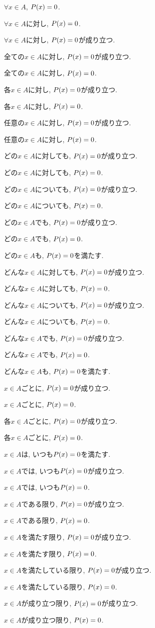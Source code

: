 \item $\forall x \in A$, $P(x)=0$.
\item $\forall x \in A$に対し, $P(x)=0$.
\item $\forall x \in A$に対し, $P(x)=0$が成り立つ.
\item 全ての$x\in A$に対し, $P(x)=0$が成り立つ.
\item 全ての$x\in A$に対し, $P(x)=0$.
\item 各$x\in A$に対し, $P(x)=0$が成り立つ.
\item 各$x\in A$に対し, $P(x)=0$.
\item 任意の$x\in A$に対し, $P(x)=0$が成り立つ.
\item 任意の$x\in A$に対し, $P(x)=0$.
\item どの$x\in A$に対しても, $P(x)=0$が成り立つ.
\item どの$x\in A$に対しても, $P(x)=0$.
\item どの$x\in A$についても, $P(x)=0$が成り立つ.
\item どの$x\in A$についても, $P(x)=0$.
\item どの$x\in A$でも, $P(x)=0$が成り立つ.
\item どの$x\in A$でも, $P(x)=0$.
\item どの$x\in A$も, $P(x)=0$を満たす.
\item どんな$x\in A$に対しても, $P(x)=0$が成り立つ.
\item どんな$x\in A$に対しても, $P(x)=0$.
\item どんな$x\in A$についても, $P(x)=0$が成り立つ.
\item どんな$x\in A$についても, $P(x)=0$.
\item どんな$x\in A$でも, $P(x)=0$が成り立つ.
\item どんな$x\in A$でも, $P(x)=0$.
\item どんな$x\in A$も, $P(x)=0$を満たす.
\item $x\in A$ごとに, $P(x)=0$が成り立つ.
\item $x\in A$ごとに, $P(x)=0$.
\item 各$x\in A$ごとに, $P(x)=0$が成り立つ.
\item 各$x\in A$ごとに, $P(x)=0$.
\item $x\in A$は, いつも$P(x)=0$を満たす.
\item $x\in A$では, いつも$P(x)=0$が成り立つ.
\item $x\in A$では, いつも$P(x)=0$.
\item $x\in A$である限り, $P(x)=0$が成り立つ.
\item $x\in A$である限り, $P(x)=0$.
\item $x\in A$を満たす限り, $P(x)=0$が成り立つ.
\item $x\in A$を満たす限り, $P(x)=0$.
\item $x\in A$を満たしている限り, $P(x)=0$が成り立つ.
\item $x\in A$を満たしている限り, $P(x)=0$.
\item $x\in A$が成り立つ限り, $P(x)=0$が成り立つ.
\item $x\in A$が成り立つ限り, $P(x)=0$.
